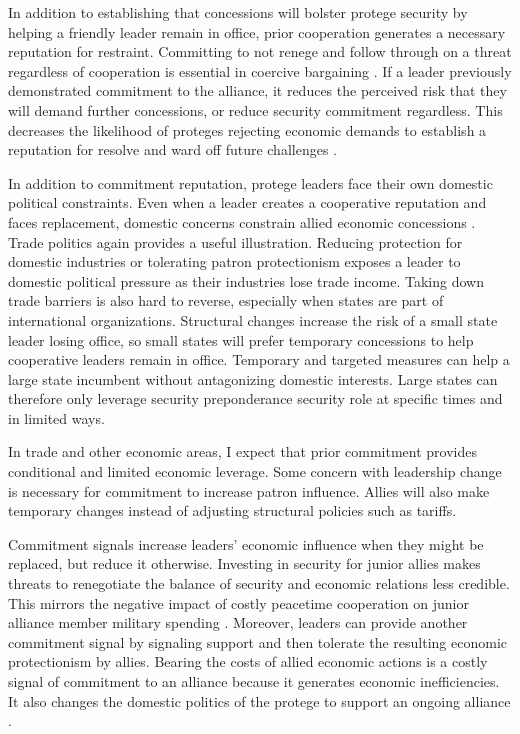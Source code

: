 \documentclass[12pt]{article}
\begin{document}
In addition to establishing that concessions will bolster protege security by helping a friendly leader remain in office, prior cooperation generates a necessary reputation for restraint. 
Committing to not renege and follow through on a threat regardless of cooperation is essential in coercive bargaining \citep{Cebuletal2021}. 
If a leader previously demonstrated commitment to the alliance, it reduces the perceived risk that they will demand further concessions, or reduce security commitment regardless.
This decreases the likelihood of proteges rejecting economic demands to establish a reputation for resolve and ward off future challenges \citep{Sechser2010, Sechser2018}. 


In addition to commitment reputation, protege leaders face their own domestic political constraints. 
Even when a leader creates a cooperative reputation and faces replacement, domestic concerns constrain allied economic concessions \citep{Davis2008}. 
Trade politics again provides a useful illustration.
Reducing protection for domestic industries or tolerating patron protectionism exposes a leader to domestic political pressure as their industries lose trade income.
Taking down trade barriers is also hard to reverse, especially when states are part of international organizations.
Structural changes increase the risk of a small state leader losing office, so small states will prefer temporary concessions to help cooperative leaders remain in office.
Temporary and targeted measures can help a large state incumbent without antagonizing domestic interests. 
Large states can therefore only leverage security preponderance security role at specific times and in limited ways.


In trade and other economic areas, I expect that prior commitment provides conditional and limited economic leverage. 
Some concern with leadership change is necessary for commitment to increase patron influence. 
Allies will also make temporary changes instead of adjusting structural policies such as tariffs. 


Commitment signals increase leaders' economic influence when they might be replaced, but reduce it otherwise. 
Investing in security for junior allies makes threats to renegotiate the balance of security and economic relations less credible. 
This mirrors the negative impact of costly peacetime cooperation on junior alliance member military spending \citep{Alley2021isq}.
Moreover, leaders can provide another commitment signal by signaling support and then tolerate the resulting economic protectionism by allies. 
Bearing the costs of allied economic actions is a costly signal of commitment to an alliance because it generates economic inefficiencies. 
It also changes the domestic politics of the protege to support an ongoing alliance \citep{Lake2013}. 
\end{document}
